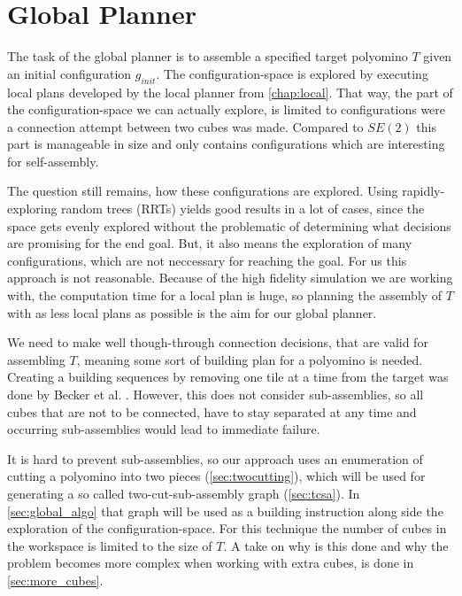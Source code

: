 \chapter{Global Planner}
\label{chap:global}

The task of the global planner is to assemble a specified target polyomino $T$ given an initial configuration $g_{init}$.
The configuration-space is explored by executing local plans developed by the local planner from \autoref{chap:local}.
That way, the part of the configuration-space we can actually explore, is limited to configurations were a connection attempt between two cubes was made.
Compared to $SE(2)$ this part is manageable in size and only contains configurations which are interesting for self-assembly.

The question still remains, how these configurations are explored.
Using rapidly-exploring random trees (RRTs) \cite{lavalle1998} yields good results in a lot of cases, since the space gets evenly explored without the problematic of determining what decisions are promising for the end goal.
But, it also means the exploration of many configurations, which are not neccessary for reaching the goal.
For us this approach is not reasonable. 
Because of the high fidelity simulation we are working with, the computation time for a local plan is huge, so planning the assembly of $T$ with as less local plans as possible is the aim for our global planner.

We need to make well though-through connection decisions, that are valid for assembling $T$, meaning some sort of building plan for a polyomino is needed.
Creating a building sequences by removing one tile at a time from the target was done by Becker et al. \cite{Becker2020}.
However, this does not consider sub-assemblies, so all cubes that are not to be connected, have to stay separated at any time and occurring sub-assemblies would lead to immediate failure.

It is hard to prevent sub-assemblies, so our approach uses an enumeration of cutting a polyomino into two pieces (\autoref{sec:twocutting}), which will be used for generating a so called two-cut-sub-assembly graph (\autoref{sec:tcsa}).
In \autoref{sec:global_algo} that graph will be used as a building instruction along side the exploration of the configuration-space.
For this technique the number of cubes in the workspace is limited to the size of $T$.
A take on why is this done and why the problem becomes more complex when working with extra cubes, is done in \autoref{sec:more_cubes}.




